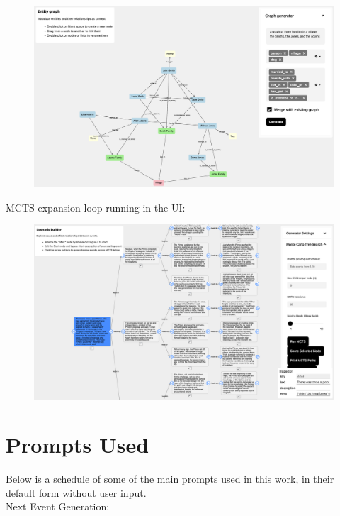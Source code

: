 \documentclass[11pt]{article}
\begin{document}
\begin{figure}[ht]
    \centering
    \includegraphics[width=1\linewidth]{figures/entities-appendix.png}
\end{figure}

\noindent
MCTS expansion loop running in the UI:

\begin{figure}[H]
    \centering
    \includegraphics[width=1\linewidth]{figures/events-appendix.png}
\end{figure}

\section{Prompts Used}
\label{appendix:prompts-used}

Below is a schedule of some of the main prompts used in this work, in their default form without user input. \\

\noindent
Next Event Generation:
\end{document}
